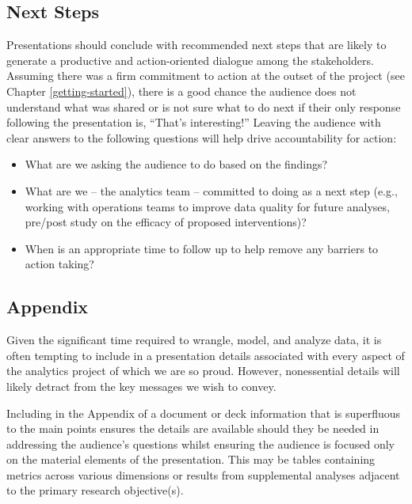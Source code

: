 \documentclass[
]{book}
\providecommand{\tightlist}{%
  \setlength{\itemsep}{0pt}\setlength{\parskip}{0pt}}
\begin{document}
\hypertarget{next-steps}{%
\subsection{Next Steps}\label{next-steps}}

Presentations should conclude with recommended next steps that are likely to generate a productive and action-oriented dialogue among the stakeholders. Assuming there was a firm commitment to action at the outset of the project (see Chapter \ref{getting-started}), there is a good chance the audience does not understand what was shared or is not sure what to do next if their only response following the presentation is, ``That's interesting!'' Leaving the audience with clear answers to the following questions will help drive accountability for action:

\begin{itemize}
\tightlist
\item
  What are we asking the audience to do based on the findings?
\item
  What are we -- the analytics team -- committed to doing as a next step (e.g., working with operations teams to improve data quality for future analyses, pre/post study on the efficacy of proposed interventions)?
\item
  When is an appropriate time to follow up to help remove any barriers to action taking?
\end{itemize}

\hypertarget{appendix}{%
\subsection{Appendix}\label{appendix}}

Given the significant time required to wrangle, model, and analyze data, it is often tempting to include in a presentation details associated with every aspect of the analytics project of which we are so proud. However, nonessential details will likely detract from the key messages we wish to convey.

Including in the Appendix of a document or deck information that is superfluous to the main points ensures the details are available should they be needed in addressing the audience's questions whilst ensuring the audience is focused only on the material elements of the presentation. This may be tables containing metrics across various dimensions or results from supplemental analyses adjacent to the primary research objective(s).
\end{document}
